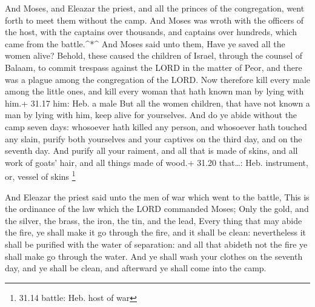  And Moses, and Eleazar the priest, and all the princes of
the congregation, went forth to meet them without the camp.
 And Moses was wroth with the officers of the host, with
the captains over thousands, and captains over hundreds, which came from
the battle.\^{}*\^{}  And Moses said unto them, Have ye
saved all the women alive?  Behold, these caused the
children of Israel, through the counsel of Balaam, to commit trespass
against the LORD in the matter of Peor, and there was a plague among the
congregation of the LORD.  Now therefore kill every male
among the little ones, and kill every woman that hath known man by lying
with him.+ 31.17 him: Heb. a male  But all the women
children, that have not known a man by lying with him, keep alive for
yourselves.  And do ye abide without the camp seven days:
whosoever hath killed any person, and whosoever hath touched any slain,
purify both yourselves and your captives on the third day, and on the
seventh day.  And purify all your raiment, and all that is
made of skins, and all work of goats' hair, and all things made of
wood.+ 31.20 that\ldots: Heb. instrument, or, vessel of skins
\footnote{31.14 battle: Heb. host of war}

 And Eleazar the priest said unto the men of war which went
to the battle, This is the ordinance of the law which the LORD commanded
Moses;  Only the gold, and the silver, the brass, the iron,
the tin, and the lead,  Every thing that may abide the
fire, ye shall make it go through the fire, and it shall be clean:
nevertheless it shall be purified with the water of separation: and all
that abideth not the fire ye shall make go through the water.
 And ye shall wash your clothes on the seventh day, and ye
shall be clean, and afterward ye shall come into the camp.

